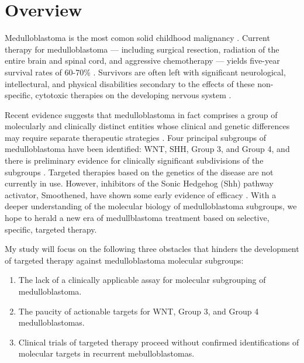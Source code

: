 \documentclass[11pt,letterpaper]{article}
\theoremstyle{definition}
\begin{document}


\section{Overview}

Medulloblastoma is the most comon solid childhood malignancy . Current therapy for medulloblastoma --- including surgical resection, radiation of the entire brain and spinal cord, and aggressive chemotherapy --- yields five-year survival rates of 60-70\% . Survivors are often left with significant neurological, intellectural, and physical disabilities secondary to the effects of these non-specific, cytotoxic therapies on the developing nervous system .

Recent evidence suggests that medulloblastoma in fact comprises a group of molecularly and clinically distinct entities whose clinical and genetic differences may require separate therapeutic strategies . Four principal subgroups of medulloblastoma have been identified: WNT, SHH, Group 3, and Group 4, and there is preliminary evidence for clinically significant subdivisions of the subgroups . Targeted therapies based on the genetics of the disease are not currently in use. However, inhibitors of the Sonic Hedgehog (Shh) pathway activator, Smoothened, have shown some early evidence of efficacy . With a deeper understanding of the molecular biology of medulloblastoma subgroups, we hope to herald a new era of medullblastoma treatment based on selective, specific, targeted therapy.

My study will focus on the following three obstacles that hinders the development of targeted therapy against medulloblastoma molecular subgroups:

\begin{enumerate}
	\item The lack of a clinically applicable assay for molecular subgrouping of medulloblastoma.
	\item The paucity of actionable targets for WNT, Group 3, and Group 4 medulloblastomas.
	\item Clinical trials of targeted therapy proceed without confirmed identifications of molecular targets in recurrent mebulloblastomas.
\end{enumerate}
\end{document}
